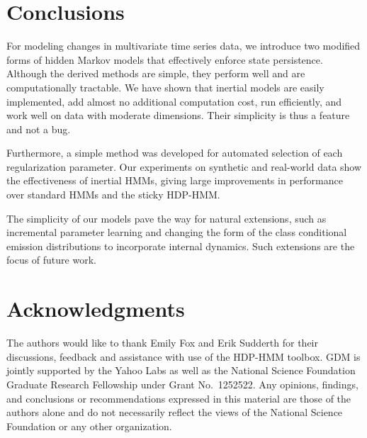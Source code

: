 \documentclass[letterpaper]{article}
\begin{document}
\section{Conclusions}

For modeling changes in multivariate time series data, we introduce two modified forms of hidden Markov models that effectively enforce state persistence. Although the derived methods are simple, they perform well and are computationally tractable. We have shown that inertial models are easily implemented, add almost no additional computation cost, run efficiently, and work well on data with moderate dimensions. Their simplicity is thus a feature and not a bug. 

Furthermore, a simple method was developed for automated selection of each regularization parameter. Our experiments on synthetic and real-world data show the effectiveness of inertial HMMs, giving large improvements in performance over standard HMMs and the sticky HDP-HMM.

The simplicity of our models pave the way for natural extensions, such as incremental parameter learning and changing the form of the class conditional emission distributions to incorporate internal dynamics. Such extensions are the focus of future work.

\section{Acknowledgments}
The authors would like to thank Emily Fox and Erik Sudderth for their
discussions, feedback and assistance with use of the HDP-HMM toolbox. GDM is
jointly supported by the Yahoo Labs as well as the National Science Foundation
Graduate Research Fellowship under Grant No.\ 1252522. Any opinions, findings, and conclusions or recommendations
expressed in this material are those of the authors alone and do not necessarily
reflect the views of the National Science Foundation or any other organization.
\vspace{0.5cm}
\fontsize{9.5pt}{10.5pt}
\selectfont


\end{document}
